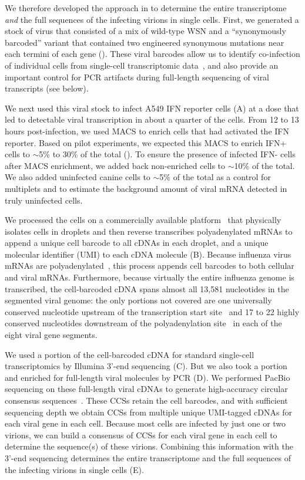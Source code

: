 \documentclass[9pt,lineno]{elife}
\begin{document}
We therefore developed the approach in  to determine the entire transcriptome \emph{and} the full sequences of the infecting virions in single cells.
First, we generated a stock of virus that consisted of a mix of wild-type WSN and a ``synonymously barcoded'' variant that contained two engineered synonymous mutations near each termini of each gene ().
These viral barcodes allow us to identify co-infection of individual cells from single-cell transcriptomic data~\citep{russell2018extreme}, and also provide an important control for PCR artifacts during full-length sequencing of viral transcripts (see below).

We next used this viral stock to infect A549 IFN reporter cells (A) at a dose that led to detectable viral transcription in about a quarter of the cells.
From 12 to 13 hours post-infection, we used MACS to enrich cells that had activated the IFN reporter.
Based on pilot experiments, we expected this MACS to enrich IFN+ cells to $\sim$5\% to 30\% of the total ().
To ensure the presence of infected IFN- cells after MACS enrichment, we added back non-enriched cells to $\sim$10\% of the total.
We also added uninfected canine cells to $\sim$5\% of the total as a control for multiplets and to estimate the background amount of viral mRNA detected in truly uninfected cells.

We processed the cells on a commercially available platform~\citep[the 10X Chromium;][]{zheng2017massively} that physically isolates cells in droplets and then reverse transcribes polyadenylated mRNAs to append a unique cell barcode to all cDNAs in each droplet, and a unique molecular identifier (UMI) to each cDNA molecule (B).
Because influenza virus mRNAs are polyadenylated~\citep{robertson1981polyadenylation}, this process appends cell barcodes to both cellular and viral mRNAs.
Furthermore, because virtually the entire influenza genome is transcribed, the cell-barcoded cDNA spans almost all 13,581 nucleotides in the segmented viral genome: the only portions not covered are one universally conserved nucleotide upstream of the transcription start site~\citep{koppstein2015sequencing} and 17 to 22 highly conserved nucleotides downstream of the polyadenylation site~\citep{robertson1981polyadenylation} in each of the eight viral gene segments.

We used a portion of the cell-barcoded cDNA for standard single-cell transcriptomics by Illumina 3'-end sequencing (C).
But we also took a portion and enriched for full-length viral molecules by PCR (D).
We performed PacBio sequencing on these full-length viral cDNAs to generate high-accuracy circular consensus sequences~\citep[CCSs;][]{travers2010flexible}.
These CCSs retain the cell barcodes, and with sufficient sequencing depth we obtain CCSs from multiple unique UMI-tagged cDNAs for each viral gene in each cell.
Because most cells are infected by just one or two virions, we can build a consensus of CCSs for each viral gene in each cell to determine the sequence(s) of these virions.
Combining this information with the 3'-end sequencing determines the entire transcriptome and the full sequences of the infecting virions in single cells (E).
\end{document}
